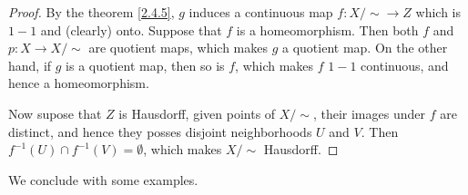 \begin{proof}
    By the theorem \ref{2.4.5}, $g$ induces a continuous map  $f:X/\sim \rightarrow Z$ which is
    $1-1$ and  (clearly) onto. Suppose that $f$ is a homeomorphism. Then both  $f$ and  $p:X
    \rightarrow X/\sim$ are quotient maps, which makes  $g$ a quotient map. On the other hand, if
    $g$ is a quotient map, then so is  $f$, which makes  $f$  $1-1$ continuous, and hence a
    homeomorphism.

    Now supose that  $Z$ is Hausdorff, given points of  $X/\sim$, their images under  $f$ are
    distinct, and hence they posses disjoint neighborhoods  $U$ and  $V$. Then  $f^{-1}(U) \cap
    f^{-1}(V)=\emptyset$, which makes $X/\sim$ Hausdorff.
\end{proof}

We conclude with some examples.

